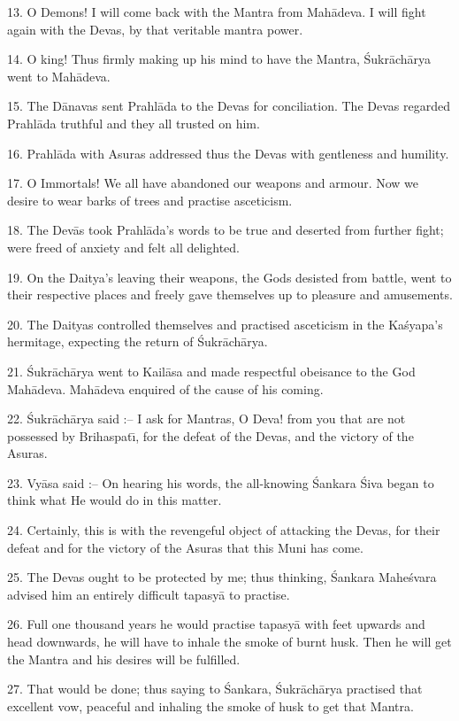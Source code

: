 13. O Demons! I will come back with the Mantra from Mah\=adeva. I will fight again with the Devas, by that veritable mantra power.

14. O king! Thus firmly making up his mind to have the Mantra, \'Sukr\=ach\=arya went to Mah\=adeva.

15. The D\=anavas sent Prahl\=ada to the Devas for conciliation. The Devas regarded Prahl\=ada truthful and they all trusted on him.

16. Prahl\=ada with Asuras addressed thus the Devas with gentleness and humility.

17. O Immortals! We all have abandoned our weapons and armour. Now we desire to wear barks of trees and practise asceticism.

18. The Dev\=as took Prahl\=ada's words to be true and deserted from further fight; were freed of anxiety and felt all delighted.

19. On the Daitya's leaving their weapons, the Gods desisted from battle, went to their respective places and freely gave themselves up to pleasure and amusements.

20. The Daityas controlled themselves and practised asceticism in the Ka\'syapa's hermitage, expecting the return of \'Sukr\=ach\=arya.

21. \'Sukr\=ach\=arya went to Kail\=asa and made respectful obeisance to the God Mah\=adeva. Mah\=adeva enquired of the cause of his coming.

22. \'Sukr\=ach\=arya said :-- I ask for Mantras, O Deva! from you that are not possessed by Brihaspat\={\i}, for the defeat of the Devas, and the victory of the Asuras.

23. Vy\=asa said :-- On hearing his words, the all-knowing \'Sankara \'Siva began to think what He would do in this matter.

24. Certainly, this is with the revengeful object of attacking the Devas, for their defeat and for the victory of the Asuras that this Muni has come.

25. The Devas ought to be protected by me; thus thinking, \'Sankara Mahe\'svara advised him an entirely difficult tapasy\=a to practise.

26. Full one thousand years he would practise tapasy\=a with feet upwards and head downwards, he will have to inhale the smoke of burnt husk. Then he will get the Mantra and his desires will be fulfilled.

27. That would be done; thus saying to \'Sankara, \'Sukr\=ach\=arya practised that excellent vow, peaceful and inhaling the smoke of husk to get that Mantra.

